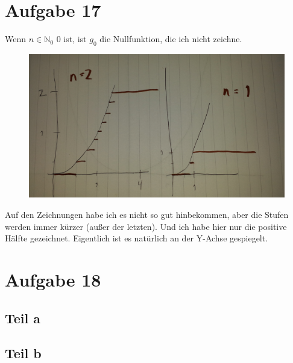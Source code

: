 \documentclass[10pt,a4paper]{article}
\begin{document}
\section{Aufgabe 17}
Wenn $n \in \mathbb{N}_{0}$ 0 ist, ist $g_{0}$ die Nullfunktion, die ich nicht zeichne.
\begin{figure}[H]
  \includegraphics[width=400pt]{5_1}
\end{figure}
Auf den Zeichnungen habe ich es nicht so gut hinbekommen, aber die Stufen werden immer kürzer (außer der letzten).
Und ich habe hier nur die positive Hälfte gezeichnet.
Eigentlich ist es natürlich an der Y-Achse gespiegelt.

\section{Aufgabe 18}

\subsection{Teil a}

\subsection{Teil b}
\end{document}
